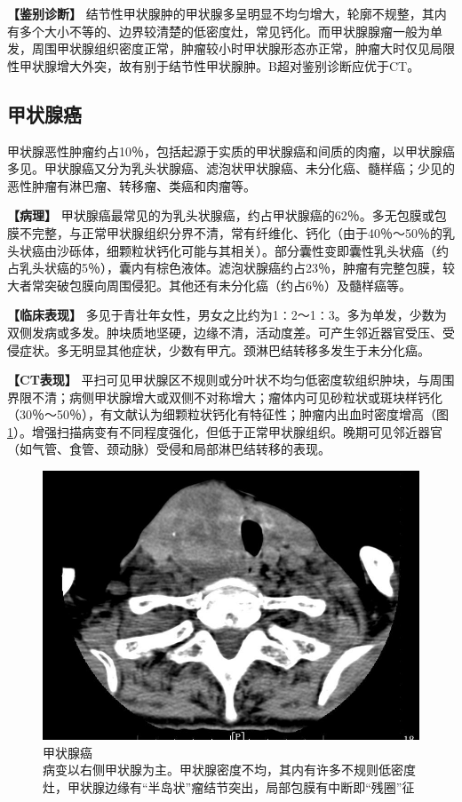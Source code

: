 \textbf{【鉴别诊断】}
结节性甲状腺肿的甲状腺多呈明显不均匀增大，轮廓不规整，其内有多个大小不等的、边界较清楚的低密度灶，常见钙化。而甲状腺腺瘤一般为单发，周围甲状腺组织密度正常，肿瘤较小时甲状腺形态亦正常，肿瘤大时仅见局限性甲状腺增大外突，故有别于结节性甲状腺肿。B超对鉴别诊断应优于CT。

\subsection{甲状腺癌}

甲状腺恶性肿瘤约占10％，包括起源于实质的甲状腺癌和间质的肉瘤，以甲状腺癌多见。甲状腺癌又分为乳头状腺癌、滤泡状甲状腺癌、未分化癌、髓样癌；少见的恶性肿瘤有淋巴瘤、转移瘤、类癌和肉瘤等。

\textbf{【病理】}
甲状腺癌最常见的为乳头状腺癌，约占甲状腺癌的62％。多无包膜或包膜不完整，与正常甲状腺组织分界不清，常有纤维化、钙化（由于40％～50％的乳头状癌由沙砾体，细颗粒状钙化可能与其相关）。部分囊性变即囊性乳头状癌（约占乳头状癌的5％），囊内有棕色液体。滤泡状腺癌约占23％，肿瘤有完整包膜，较大者常突破包膜向周围侵犯。其他还有未分化癌（约占6％）及髓样癌等。

\textbf{【临床表现】}
多见于青壮年女性，男女之比约为1∶2～1∶3。多为单发，少数为双侧发病或多发。肿块质地坚硬，边缘不清，活动度差。可产生邻近器官受压、受侵症状。多无明显其他症状，少数有甲亢。颈淋巴结转移多发生于未分化癌。

\textbf{【CT表现】}
平扫可见甲状腺区不规则或分叶状不均匀低密度软组织肿块，与周围界限不清；病侧甲状腺增大或双侧不对称增大；瘤体内可见砂粒状或斑块样钙化（30％～50％），有文献认为细颗粒状钙化有特征性；肿瘤内出血时密度增高（图\ref{fig8-11}）。增强扫描病变有不同程度强化，但低于正常甲状腺组织。晚期可见邻近器官（如气管、食管、颈动脉）受侵和局部淋巴结转移的表现。

\begin{figure}[!htbp]
 \centering
 \includegraphics[width=.7\textwidth,height=\textheight,keepaspectratio]{./images/Image00179.jpg}
 \captionsetup{justification=centering}
 \caption{甲状腺癌\\{\small 病变以右侧甲状腺为主。甲状腺密度不均，其内有许多不规则低密度灶，甲状腺边缘有“半岛状”瘤结节突出，局部包膜有中断即“残圈”征}}
 \label{fig8-11}
  \end{figure} 

